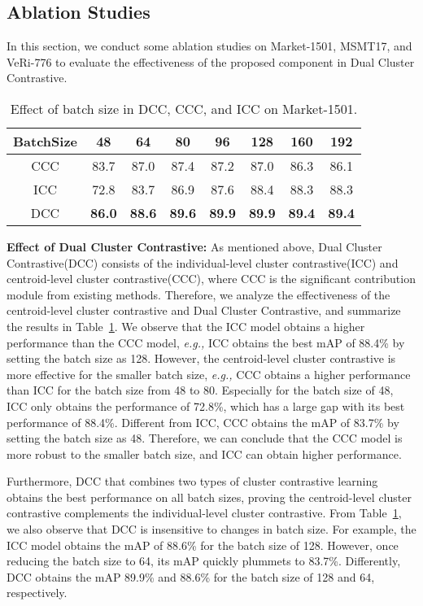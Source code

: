 \documentclass[10pt,twocolumn,letterpaper]{article}
\begin{document}
\subsection{Ablation Studies}
In this section, we conduct some ablation studies on Market-1501, MSMT17, and VeRi-776 to evaluate the effectiveness of the proposed component in Dual Cluster Contrastive.

\begin{table}
\footnotesize
\begin{center}
\begin{tabular}{c|ccccccc}
\toprule
BatchSize          & 48& 64 & 80 & 96 & 128 & 160 & 192\\
\midrule
CCC& 83.7 & 87.0 & 87.4 & 87.2 & 87.0 & 86.3 & 86.1\\
ICC &72.8&83.7&86.9&87.6& 88.4&88.3&88.3\\
DCC &\textbf{86.0} & \textbf{88.6} & \textbf{89.6} & \textbf{89.9} & \textbf{89.9} & \textbf{89.4} & \textbf{89.4}\\ \bottomrule
\end{tabular}
\caption{\small Effect of batch size in DCC, CCC, and ICC on Market-1501.}
\label{tab:effect_ccc}
\end{center}
\end{table}

\textbf{Effect of Dual Cluster Contrastive:}
As mentioned above, Dual Cluster Contrastive(DCC) consists of the individual-level cluster contrastive(ICC) and centroid-level cluster contrastive(CCC), where CCC is the significant contribution module from existing methods.
Therefore, we analyze the effectiveness of the centroid-level cluster contrastive and Dual Cluster Contrastive, and summarize the results in Table~\ref{tab:effect_ccc}.
We observe that the ICC model obtains a higher performance than the CCC model, \emph{e.g.,} ICC obtains the best mAP of 88.4\% by setting the batch size as 128.
However, the centroid-level cluster contrastive is more effective for the smaller batch size, \emph{e.g.,} CCC obtains a higher performance than ICC for the batch size from 48 to 80.
Especially for the batch size of 48, ICC only obtains the performance of 72.8\%,  which has a large gap with its best performance of 88.4\%.
Different from ICC, CCC obtains the mAP of 83.7\% by setting the batch size as 48.
Therefore, we can conclude that the CCC model is more robust to the smaller batch size, and ICC can obtain higher performance.

Furthermore, DCC that combines two types of cluster contrastive learning obtains the best performance on all batch sizes, proving the centroid-level cluster contrastive complements the individual-level cluster contrastive.
From Table~\ref{tab:effect_ccc}, we also observe that DCC is insensitive to changes in batch size.
For example, the ICC model obtains the mAP of 88.6\% for the batch size of 128.
However, once reducing the batch size to 64, its mAP quickly plummets to 83.7\%.
Differently, DCC obtains the mAP 89.9\% and 88.6\% for the batch size of 128 and 64, respectively.  
\end{document}
